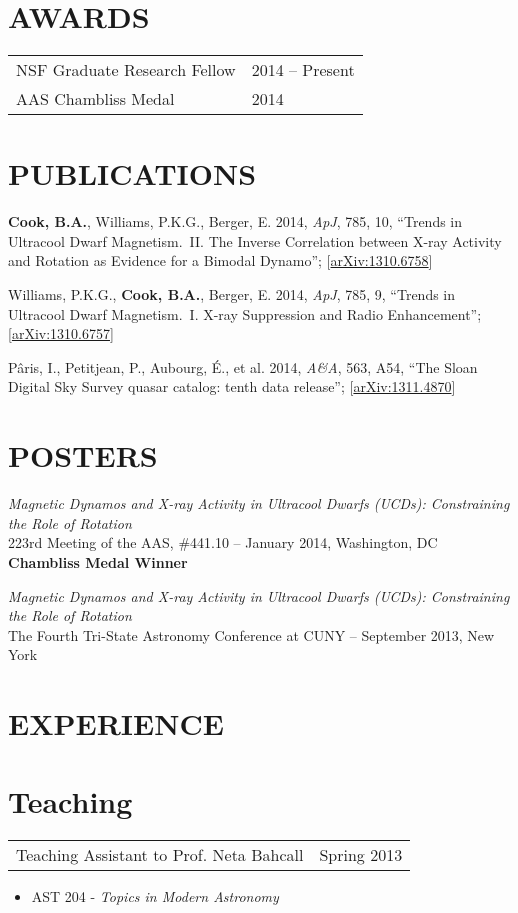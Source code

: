 \documentclass[margin]{res}
\begin{document}
\begin{resume}
\section{AWARDS}
\begin{tabular}{ll}
NSF Graduate Research Fellow & 2014 -- Present\\
AAS Chambliss Medal & 2014
\end{tabular}

\section{PUBLICATIONS}

\textbf{Cook, B.A.}, Williams, P.K.G., Berger, E. 2014, \textit{ApJ},
785, 10, ``Trends in Ultracool Dwarf Magnetism.~II. The Inverse
Correlation between X-ray Activity and Rotation as Evidence for a
Bimodal Dynamo'';
[\href{http://arxiv.org/abs/1310.6758}{arXiv:1310.6758}]

Williams, P.K.G., \textbf{Cook, B.A.}, Berger, E. 2014, \textit{ApJ},
785, 9, ``Trends in Ultracool Dwarf Magnetism.~I. X-ray Suppression
and Radio Enhancement'';
[\href{http://arxiv.org/abs/1310.6757}{arXiv:1310.6757}]

P\^{a}ris, I., Petitjean, P., Aubourg, \'E., et al. 2014,
\textit{A\&A}, 563, A54, ``The Sloan Digital Sky Survey quasar
catalog: tenth data release''; [\href{http://arxiv.org/abs/1311.4870}{arXiv:1311.4870}]

\section{POSTERS}

\textit{Magnetic Dynamos and X-ray Activity in Ultracool Dwarfs (UCDs):
Constraining the Role of Rotation}\\ 223rd Meeting of the AAS,
\#441.10 -- January 2014, Washington, DC \\ \textbf{Chambliss Medal
  Winner}

\textit{Magnetic Dynamos and X-ray Activity in Ultracool Dwarfs
  (UCDs): Constraining the Role of Rotation}\\ The Fourth Tri-State
Astronomy Conference at CUNY -- September 2013, New York

\section{EXPERIENCE}      
\normalsize{\section{Teaching}}
\begin{tabular}{@{}p{4in} r}
  Teaching Assistant to Prof. Neta Bahcall & Spring 2013
\end{tabular}
\begin{itemize}
\item[] AST 204 - \textit{Topics in Modern Astronomy}
\end{itemize}


\end{resume}
\end{document}
